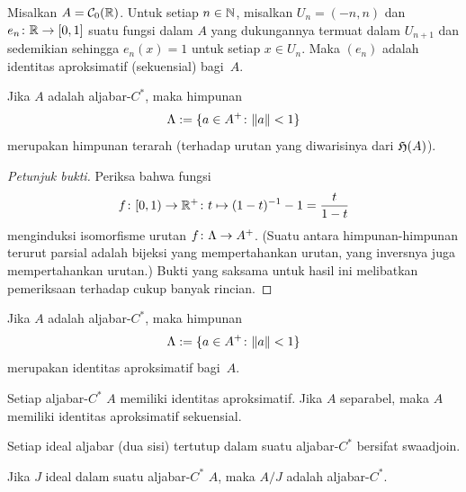 \begin{exam} Misalkan $A = \mathcal{C}_0(\mathbb{R})$. Untuk setiap $n \in \mathbb{N}$, misalkan $U_n = (-n,n)$ dan
$e_n\colon \mathbb{R} \rightarrow [0,1]$ suatu fungsi dalam $A$ yang dukungannya termuat dalam $U_{n+1}$
dan sedemikian sehingga $e_n(x) = 1$ untuk setiap $x \in U_n$. Maka $(e_n)$ adalah identitas
aproksimatif (sekuensial) bagi~$A$.
\end{exam}

\begin{prop} Jika $A$ adalah aljabar-$C^*$, maka himpunan
   \[ \Lambda := \{a \in A^+\colon \lVert a\rVert < 1\} \]
merupakan himpunan terarah (terhadap urutan yang diwarisinya dari $\mathfrak{H}(A)$).
\end{prop}

\begin{proof}[\emph{Petunjuk bukti}] Periksa bahwa fungsi
  \[ f\colon [0,1) \rightarrow \mathbb{R}^+\colon t \mapsto (1 - t)^{-1} - 1 = \frac t{1 - t} \]
menginduksi isomorfisme urutan $f\colon \Lambda \rightarrow A^+$. (Suatu
 antara himpunan-himpunan terurut parsial adalah bijeksi yang mempertahankan urutan,
yang inversnya juga mempertahankan urutan.) Bukti yang saksama untuk hasil ini melibatkan pemeriksaan
terhadap cukup banyak rincian. \ns
\end{proof}

\begin{prop} Jika $A$ adalah aljabar-$C^*$, maka himpunan
  \[ \Lambda := \{a \in A^+\colon \lVert a\rVert < 1\} \]
merupakan identitas aproksimatif bagi~$A$.
\end{prop}

\begin{cor}\label{00190161} Setiap aljabar-$C^*$ $A$ memiliki identitas aproksimatif.
Jika $A$ separabel, maka $A$ memiliki identitas aproksimatif sekuensial.
\end{cor}

\begin{prop}\label{0019017} Setiap ideal aljabar (dua sisi) tertutup dalam suatu aljabar-$C^*$
bersifat swaadjoin.
\end{prop}

\begin{prop}\label{001902} Jika $J$ ideal dalam suatu aljabar-$C^*$ $A$, maka
$A/J$ adalah aljabar-$C^*$.
\end{prop}

